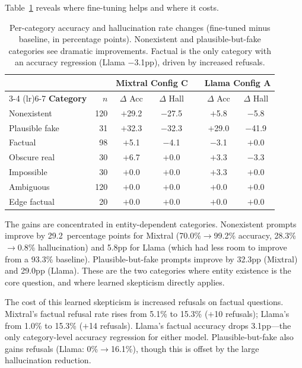 Table~\ref{tab:ft-per-category} reveals where fine-tuning helps and where it costs.

\begin{table}[ht]
\centering
\small
\begin{tabular}{@{}lrccccc@{}}
\toprule
& & \multicolumn{2}{c}{\textbf{Mixtral Config C}} & & \multicolumn{2}{c}{\textbf{Llama Config A}} \\
\cmidrule(lr){3-4} \cmidrule(lr){6-7}
\textbf{Category} & $n$ & $\Delta$ Acc & $\Delta$ Hall & & $\Delta$ Acc & $\Delta$ Hall \\
\midrule
Nonexistent & 120 & $+$29.2 & $-$27.5 & & $+$5.8 & $-$5.8 \\
Plausible fake & 31 & $+$32.3 & $-$32.3 & & $+$29.0 & $-$41.9 \\
Factual & 98 & $+$5.1 & $-$4.1 & & $-$3.1 & $+$0.0 \\
Obscure real & 30 & $+$6.7 & $+$0.0 & & $+$3.3 & $-$3.3 \\
Impossible & 30 & $+$0.0 & $+$0.0 & & $+$3.3 & $+$0.0 \\
Ambiguous & 120 & $+$0.0 & $+$0.0 & & $+$0.0 & $+$0.0 \\
Edge factual & 20 & $+$0.0 & $+$0.0 & & $+$0.0 & $+$0.0 \\
\bottomrule
\end{tabular}
\caption{Per-category accuracy and hallucination rate changes (fine-tuned minus baseline, in percentage points). Nonexistent and plausible-but-fake categories see dramatic improvements. Factual is the only category with an accuracy regression (Llama $-$3.1pp), driven by increased refusals.}
\label{tab:ft-per-category}
\end{table}

The gains are concentrated in entity-dependent categories. Nonexistent prompts improve by 29.2~percentage points for Mixtral (70.0\%$\to$99.2\% accuracy, 28.3\%$\to$0.8\% hallucination) and 5.8pp for Llama (which had less room to improve from a 93.3\% baseline). Plausible-but-fake prompts improve by 32.3pp (Mixtral) and 29.0pp (Llama). These are the two categories where entity existence is the core question, and where learned skepticism directly applies.

The cost of this learned skepticism is increased refusals on factual questions. Mixtral's factual refusal rate rises from 5.1\% to 15.3\% ($+$10 refusals); Llama's from 1.0\% to 15.3\% ($+$14 refusals). Llama's factual accuracy drops 3.1pp---the only category-level accuracy regression for either model. Plausible-but-fake also gains refusals (Llama: 0\%$\to$16.1\%), though this is offset by the large hallucination reduction.

